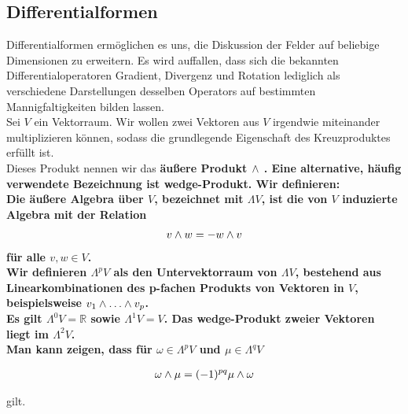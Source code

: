\subsection{Differentialformen}
Differentialformen ermöglichen es uns, die Diskussion der Felder auf beliebige Dimensionen zu erweitern. Es wird auffallen, dass sich die bekannten Differentialoperatoren Gradient, Divergenz und Rotation lediglich als verschiedene Darstellungen desselben Operators auf bestimmten Mannigfaltigkeiten bilden lassen. \\
Sei $V$ ein Vektorraum. Wir wollen zwei Vektoren aus $V$ irgendwie miteinander multiplizieren können, sodass die grundlegende Eigenschaft des Kreuzproduktes erfüllt ist. \\
Dieses Produkt nennen wir das \bfseries äußere Produkt $\wedge$ \normalfont. Eine alternative, häufig verwendete Bezeichnung ist \bfseries wedge-Produkt. \normalfont
Wir definieren: \\
Die äußere Algebra über $V$, bezeichnet mit $\Lambda V$, ist die von $V$ induzierte Algebra mit der Relation
\begin{align}
v \wedge w = -w \wedge v
\end{align}
für alle $v,w \in V$. \\
Wir definieren $\Lambda^p V$ als den Untervektorraum von $\Lambda V$, bestehend aus Linearkombinationen des p-fachen Produkts von Vektoren in $V$, beispielsweise $v_1 \w \dots \w v_p$. \\
Es gilt $\Lambda^0 V = \mathbb{R}$ sowie $\Lambda^1 V = V$. Das wedge-Produkt zweier Vektoren liegt im $\Lambda^2 V$. \\

Man kann zeigen, dass für $\omega \in \Lambda^p V$ und $\mu \in \Lambda^q V$

\begin{align*}
\omega \wedge \mu = (-1)^{pq} \mu \wedge \omega
\end{align*}

gilt. \\

